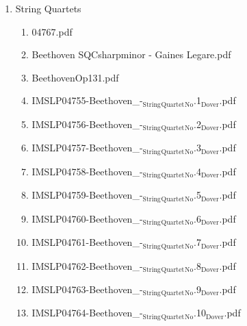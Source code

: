 \documentclass[11pt]{article}
\begin{document}
\begin{enumerate}
\item String Quartets
\label{sec-1-1-1-1-44-9-9}
\begin{enumerate}
\item 04767.pdf
\label{sec-1-1-1-1-44-9-9-1}

\item Beethoven SQCsharpminor - Gaines Legare.pdf
\label{sec-1-1-1-1-44-9-9-2}

\item BeethovenOp131.pdf
\label{sec-1-1-1-1-44-9-9-3}

\item IMSLP04755-Beethoven\_-$_{\text{String}}$$_{\text{Quartet}}$$_{\text{No}}$.1$_{\text{Dover}}$.pdf
\label{sec-1-1-1-1-44-9-9-4}

\item IMSLP04756-Beethoven\_-$_{\text{String}}$$_{\text{Quartet}}$$_{\text{No}}$.2$_{\text{Dover}}$.pdf
\label{sec-1-1-1-1-44-9-9-5}

\item IMSLP04757-Beethoven\_-$_{\text{String}}$$_{\text{Quartet}}$$_{\text{No}}$.3$_{\text{Dover}}$.pdf
\label{sec-1-1-1-1-44-9-9-6}

\item IMSLP04758-Beethoven\_-$_{\text{String}}$$_{\text{Quartet}}$$_{\text{No}}$.4$_{\text{Dover}}$.pdf
\label{sec-1-1-1-1-44-9-9-7}

\item IMSLP04759-Beethoven\_-$_{\text{String}}$$_{\text{Quartet}}$$_{\text{No}}$.5$_{\text{Dover}}$.pdf
\label{sec-1-1-1-1-44-9-9-8}

\item IMSLP04760-Beethoven\_-$_{\text{String}}$$_{\text{Quartet}}$$_{\text{No}}$.6$_{\text{Dover}}$.pdf
\label{sec-1-1-1-1-44-9-9-9}

\item IMSLP04761-Beethoven\_-$_{\text{String}}$$_{\text{Quartet}}$$_{\text{No}}$.7$_{\text{Dover}}$.pdf
\label{sec-1-1-1-1-44-9-9-10}

\item IMSLP04762-Beethoven\_-$_{\text{String}}$$_{\text{Quartet}}$$_{\text{No}}$.8$_{\text{Dover}}$.pdf
\label{sec-1-1-1-1-44-9-9-11}

\item IMSLP04763-Beethoven\_-$_{\text{String}}$$_{\text{Quartet}}$$_{\text{No}}$.9$_{\text{Dover}}$.pdf
\label{sec-1-1-1-1-44-9-9-12}

\item IMSLP04764-Beethoven\_-$_{\text{String}}$$_{\text{Quartet}}$$_{\text{No}}$.10$_{\text{Dover}}$.pdf
\label{sec-1-1-1-1-44-9-9-13}


\end{enumerate}
\end{enumerate}
\end{document}
